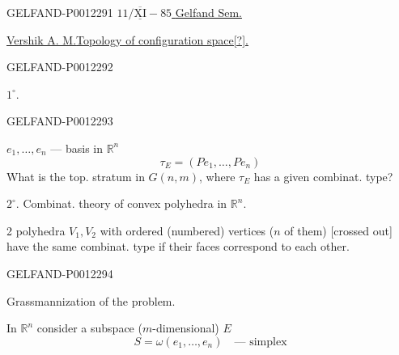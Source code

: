\begin{GelfandAdjacentEvidence}{GELFAND-P001229}{1}
\underline{\(11/\overline{\underline{\mathrm{XI}}}-85\)  }\qquad
\underline{Gelfand Sem.}

\underline{\underline{Vershik A. M.}}\qquad \underline{Topology of configuration space[?].}
\end{GelfandAdjacentEvidence}
\begin{GelfandAdjacentEvidence}{GELFAND-P001229}{2}


\(1^{\circ}.\)
\end{GelfandAdjacentEvidence}
\begin{GelfandAdjacentEvidence}{GELFAND-P001229}{3}

\(e_1,\ldots,e_n\) --- basis in \(\mathbb R^n\)
\begin{equation*}
\tau_E=(Pe_1,\ldots,Pe_n)
\end{equation*}
What is the top. stratum in \(G(n,m)\), where \(\tau_E\) has a given combinat. type?

\(2^{\circ}.\) Combinat. theory of convex polyhedra in \(\mathbb R^n\).

2 polyhedra \(V_1,V_2\) with ordered (numbered) vertices (\(n\) of them)
[crossed out] have the same combinat. type if their faces correspond to each other.
\end{GelfandAdjacentEvidence}
\begin{GelfandAdjacentEvidence}{GELFAND-P001229}{4}


Grassmannization of the problem.

In \(\mathbb R^n\) consider a subspace (\(m\)-dimensional) \(E\)
\begin{equation*}
S=\omega(e_1,\ldots,e_n)\quad\text{--- simplex}
\end{equation*}
\end{GelfandAdjacentEvidence}
